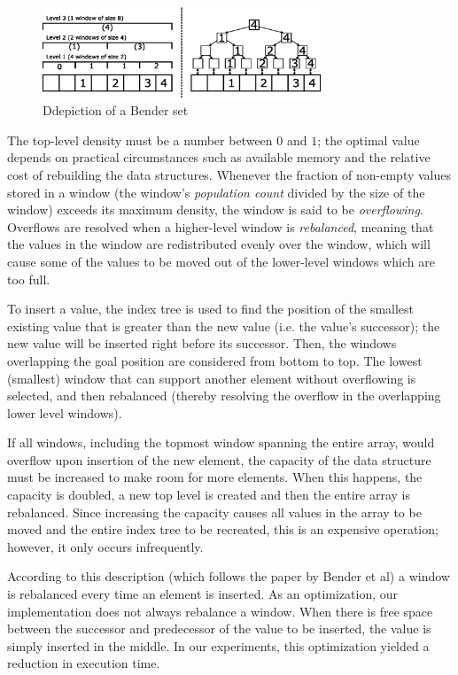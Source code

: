 \documentclass{acm_proc_article-sp}
\begin{document}
\begin{figure}
\centering
\includegraphics[width=83mm]{bender-set}
\caption{Ddepiction of a Bender set}
\label{fig-bender-set}
\end{figure}

The top-level density must be a number between $0$ and $1$; the optimal value
depends on practical circumstances such as available memory and the relative
cost of rebuilding the data structures.
Whenever the fraction of non-empty values stored in a window (the window's
\emph{population count} divided by the size of the window) exceeds its maximum
density, the window is said to be \emph{overflowing}.
Overflows are resolved when a higher-level window is \emph{rebalanced},
meaning that the values in the window are redistributed evenly over the window,
which will cause some of the values to be moved out of the lower-level windows
which are too full.

To insert a value, the index tree is used to find the position of the smallest
existing value that is greater than the new value (i.e. the value's successor);
the new value will be inserted right before its successor.
Then, the windows overlapping the goal position are considered from bottom to
top. The lowest (smallest) window that can support another element without
overflowing is selected, and then rebalanced (thereby resolving the overflow in
the overlapping lower level windows).

If all windows, including the topmost window spanning the entire array,
would overflow upon insertion of the new element, the capacity of the data
structure must be increased to make room for more elements.
When this happens, the capacity is doubled, a new top level is
created and then the entire array is rebalanced.
Since increasing the capacity causes all values in the array to be moved
and the entire index tree to be recreated, this is an expensive operation;
however, it only occurs infrequently.

According to this description (which follows the paper by Bender et al) a window
is rebalanced every time an element is inserted. As an optimization, our
implementation does not always rebalance a window. When there is free space
between the successor and predecessor of the value to be inserted, the value
is simply inserted in the middle. In our experiments, this optimization
yielded a reduction in execution time.
\end{document}
